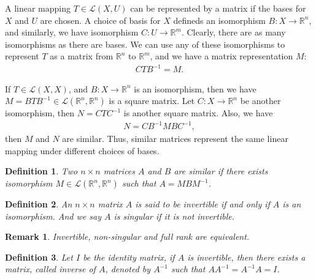 \documentclass[11pt]{book}
\newtheorem{definition}{Definition}[chapter]
\newtheorem{remark}{Remark}[chapter]
\theoremstyle{definition}
\numberwithin{equation}{chapter}
\begin{document}
\medskip

A linear mapping $T\in\mathscr{L}(X,U)$ can be represented by a matrix if the bases for $X$ and $U$ are chosen. A choice of basis for $X$ defineds an isomorphism $B:X\to\mathbb{R}^n$, and similarly, we have isomorphism $C: U\to\mathbb{R}^m$. Clearly, there are as many isomorphisms as there are bases. We can use any of these isomorphisms to represent $T$ as a matrix from $\mathbb{R}^n$ to $\mathbb{R}^m$, and we have a matrix representation $M$:
\begin{align*}
    CTB^{-1} = M.
\end{align*}

If $T\in\mathscr{L}(X,X)$, and $B:X\to\mathbb{R}^n$ is an isomorphism, then we have $M = BTB^{-1}\in\mathscr{L}(\mathbb{R}^n,\mathbb{R}^n)$ is a square matrix. Let $C:X\to\mathbb{R}^n$ be another isomorphism, then $N = CTC^{-1}$ is another square matrix. Also, we have 
\begin{align*}
    N = C B^{-1} M B C^{-1},
\end{align*}
then $M$ and $N$ are similar. Thus, similar matrices represent the same linear mapping under different choices of bases.

\medskip

\begin{definition}
Two $n\times n$ matrices $A$ and $B$ are similar if there exists isomorphism $M\in\mathscr{L}(\mathbb{R}^n,\mathbb{R}^n)$ such that $A = MBM^{-1}$.
\end{definition}

\medskip

\begin{definition}
An $n\times n$ matrix $A$ is said to be invertible if and only if $A$ is an isomorphism. And we say $A$ is singular if it is not invertible.
\end{definition}
\begin{remark}
Invertible, non-singular and full rank are equivalent.
\end{remark}

\medskip

\begin{definition}
Let $I$ be the identity matrix, if $A$ is invertible, then there exists a matrix, called inverse of $A$, denoted by $A^{-1}$ such that $AA^{-1} = A^{-1}A = I$.
\end{definition}

\medskip



\medskip
\end{document}
